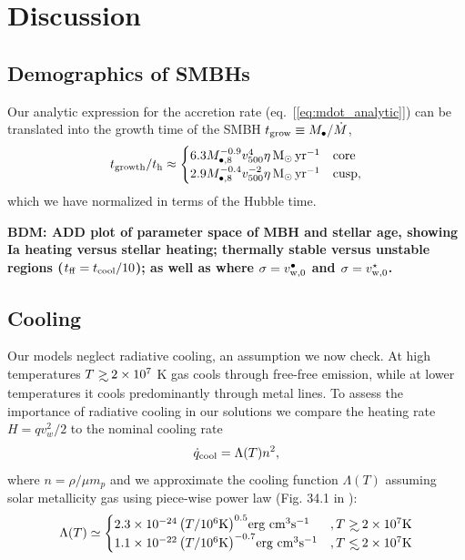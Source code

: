 \documentclass[usenatbib,fleqn]{mn2e}
\newcommand\lsim{\mathrel{\rlap{\lower4pt\hbox{\hskip1pt$\sim$}}
    \raise1pt\hbox{$<$}}}
\newcommand\gsim{\mathrel{\rlap{\lower4pt\hbox{\hskip1pt$\sim$}}
    \raise1pt\hbox{$>$}}}
\newcommand{\vw}{v_w}
\newcommand{\Mbheight}{M_{\bullet,8}}
\newcommand{\pyear}{{\rm yr}^{-1}}
\begin{document}
\section{Discussion}
\label{sec:discussion}

\subsection{Demographics of SMBHs}

Our analytic expression for the accretion rate (eq.~[\ref{eq:mdot_analytic}]) can be translated into the growth time of the SMBH $t_{\rm grow} \equiv M_{\bullet}/\dot{M}$,
\begin{eqnarray}
  t_{\rm growth}/t_{\rm h} \approx 
  \begin{cases}
    6.3 M_{\bullet,8}^{-0.9}
    v_{500}^{4}  \eta \Msun \, \pyear& \text{core} \\
    2.9 \Mbheight^{-0.4}
    v_{500}^{-2}  \eta \Msun \, \pyear  & \text{cusp}, 
  \end{cases}
  \label{eq:tgrow_analytic}
\end{eqnarray}
which we have normalized in terms of the Hubble time.  

{\bf BDM: ADD plot of parameter space of MBH and stellar age, showing Ia heating versus stellar heating; thermally stable versus unstable regions ($t_{\rm ff} = t_{\rm cool}/10$); as well as where $\sigma = v_{\rm w,0}^{\bullet}$ and $\sigma = v_{\rm w,0}^{\star}$.  }

\subsection{Cooling}
\label{sec:cooling}
Our models neglect radiative cooling, an assumption we now check.  At high temperatures $T\gsim 2\times 10^7$ K gas cools through free-free emission, while at lower temperatures it cools predominantly through metal lines.  To assess the importance of radiative cooling in our solutions we compare the heating rate $H=q \vw^2/2$ to the nominal cooling rate
\begin{align}
  \dot{q}_{\rm cool} =\Lambda(T) n^2,
\label{eq:cooling}
\end{align}
where $n = \rho/\mu m_p$ and we approximate the cooling function $\Lambda(T)$ assuming solar metallicity gas using piece-wise power law (Fig. 34.1 in \cite{Draine:2011a}):
\begin{align}
\Lambda(T)\simeq
  \begin{cases}
    2.3 \times 10^{-24} \left(T/10^6 \text{K}\right)^{0.5} $erg cm$^3 $s$^{-1}&, T \gsim 2 \times 10^7 \text{K} \\
    1.1 \times 10^{-22} \left(T/10^6 \text{K}\right)^{-0.7}  $erg cm$^3 $s$^{-1}&, T \lsim 2 \times 10^7 \text{K}     
  \end{cases}
  \label{eq:cooling2}
\end{align}
\end{document}
